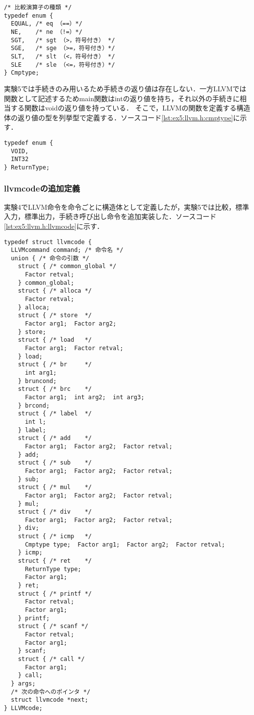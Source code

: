 \documentclass[uplatex]{jsarticle}
\begin{document}
\begin{lstlisting}[caption=比較の種別を表す列挙型Cmptype,label=lst:ex5:llvm.h:cmptype]
/* 比較演算子の種類 */
typedef enum {
  EQUAL, /* eq （==）*/
  NE,    /* ne （!=）*/
  SGT,   /* sgt （>，符号付き） */
  SGE,   /* sge （>=，符号付き）*/
  SLT,   /* slt （<，符号付き） */
  SLE    /* sle （<=，符号付き）*/
} Cmptype;
\end{lstlisting}

実験5では手続きのみ用いるため手続きの返り値は存在しない．一方LLVMでは関数として記述するためmain関数はintの返り値を持ち，それ以外の手続きに相当する関数はvoidの返り値を持っている．
そこで，LLVMの関数を定義する構造体の返り値の型を列挙型で定義する．ソースコード\ref{lst:ex5:llvm.h:cmptype}に示す．

\begin{lstlisting}[caption=LLVMコマンドを表す列挙型LLVMcommand,label=lst:ex5:llvm.h:cmptype]
typedef enum {
  VOID,
  INT32
} ReturnType;
\end{lstlisting}

\subsubsection {llvmcodeの追加定義}

実験4でLLVM命令を命令ごとに構造体として定義したが，実験5では比較，標準入力，標準出力，手続き呼び出し命令を追加実装した．ソースコード\ref{lst:ex5:llvm.h:llvmcode}に示す．

\begin{lstlisting}[caption=LLVMコードの追加実装,label=lst:ex5:llvm.h:llvmcode]
typedef struct llvmcode {
  LLVMcommand command; /* 命令名 */
  union { /* 命令の引数 */
    struct { /* common_global */
      Factor retval;
    } common_global;
    struct { /* alloca */
      Factor retval;
    } alloca;
    struct { /* store  */
      Factor arg1;  Factor arg2;
    } store;
    struct { /* load   */
      Factor arg1;  Factor retval;
    } load;
    struct { /* br     */
      int arg1;
    } bruncond;
    struct { /* brc    */
      Factor arg1;  int arg2;  int arg3;
    } brcond;
    struct { /* label  */
      int l;
    } label;
    struct { /* add    */
      Factor arg1;  Factor arg2;  Factor retval;
    } add;
    struct { /* sub    */
      Factor arg1;  Factor arg2;  Factor retval;
    } sub;
    struct { /* mul    */
      Factor arg1;  Factor arg2;  Factor retval;
    } mul;
    struct { /* div    */
      Factor arg1;  Factor arg2;  Factor retval;
    } div;
    struct { /* icmp   */
      Cmptype type;  Factor arg1;  Factor arg2;  Factor retval;
    } icmp;
    struct { /* ret    */
      ReturnType type;
      Factor arg1;
    } ret;
    struct { /* printf */
      Factor retval;
      Factor arg1;
    } printf;
    struct { /* scanf */
      Factor retval;
      Factor arg1;
    } scanf;
    struct { /* call */
      Factor arg1;
    } call;
  } args;
  /* 次の命令へのポインタ */
  struct llvmcode *next;
} LLVMcode;
\end{lstlisting}
\end{document}
